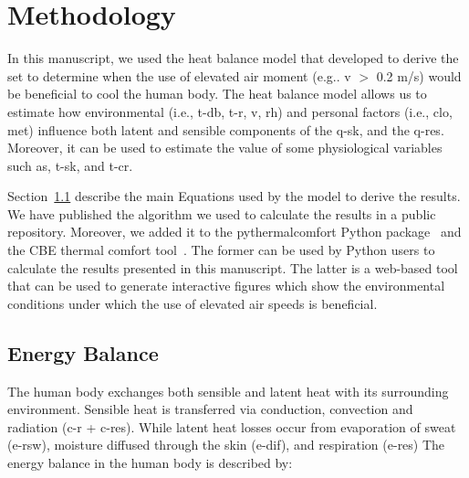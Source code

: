 
\section{Methodology}\label{sec:methodology}


In this manuscript, we used the heat balance model that  developed to derive the \ac{set} to determine when the use of elevated air moment (e.g.. \ac{v} $>$ 0.2 m/s) would be beneficial to cool the human body.
The heat balance model allows us to estimate how environmental (i.e., \ac{t-db}, \ac{t-r}, \ac{v}, \ac{rh}) and personal factors (i.e., \ac{clo}, \ac{met}) influence both latent and sensible components of the \ac{q-sk}, and the \ac{q-res}.
Moreover, it can be used to estimate the value of some physiological variables such as, \ac{t-sk}, and \ac{t-cr}.

Section~\ref{subsec:energy-balance} describe the main Equations used by the model to derive the results.
We have published the algorithm we used to calculate the results in a public repository.
Moreover, we added it to the pythermalcomfort Python package~\cite{Tartarini2020a} and the CBE thermal comfort tool~\cite{Tartarini2020}.
The former can be used by Python users to calculate the results presented in this manuscript.
The latter is a web-based tool that can be used to generate interactive figures which show the environmental conditions under which the use of elevated air speeds is beneficial.

\subsection{Energy Balance}\label{subsec:energy-balance}

The human body exchanges both sensible and latent heat with its surrounding environment.
Sensible heat is transferred via conduction, convection and radiation (\acs{c-r} + \acs{c-res}).
While latent heat losses occur from evaporation of sweat  (\acs{e-rsw}), moisture diffused through the skin  (\acs{e-dif}), and respiration (\acs{e-res})
The energy balance in the human body is described by:

